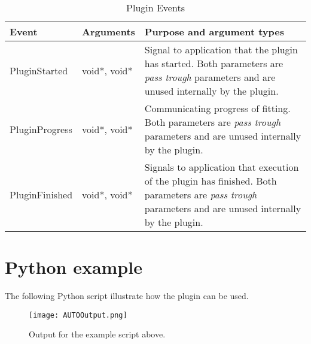 \begin{table}[ht]
\centering %
\begin{tabular}{l l p{9cm}} 

Event & Arguments & Purpose and argument types \\ [0.5ex] %
\hline %
PluginStarted  	& 	void*, void*  & Signal to application that the plugin has started. Both parameters are \emph{pass trough} parameters and are unused internally by the plugin.\\[0.5ex]
PluginProgress	& 	void*, void*  & Communicating progress of fitting. Both parameters are \emph{pass trough} parameters and are unused internally by the plugin. \\[0.5ex]
PluginFinished	& 	void*, void*  & Signals to application that execution of the plugin has finished. Both parameters are \emph{pass trough} parameters and are unused internally by the plugin.\\

\hline %
\end{tabular}
\caption{Plugin Events} 
\label{table:autoPluginEvents} 
\end{table}

\section{Python example}
The following Python script illustrate how the plugin can be used. 

\begin{singlespace}

\end{singlespace}

\begin{figure}
\centering
\texttt{[image: AUTOOutput.png]}
\caption{Output for the example script above.}
\label{fig:nmFig}
\end{figure}






